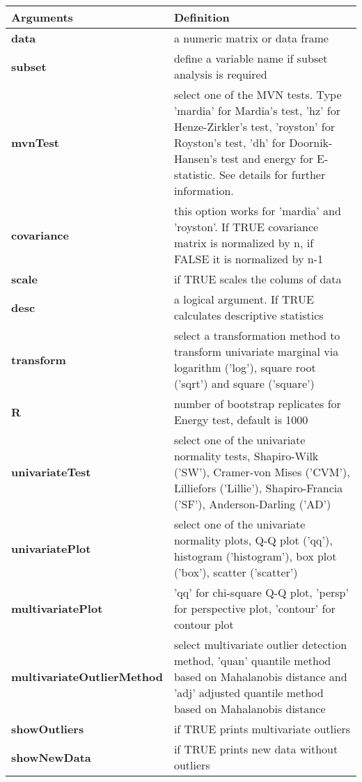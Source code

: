 \documentclass[11pt]{article}
\begin{document}
\begin{Schunk}
\begin{Soutput}
\begin{table}[H]
\centering{}
\begin{table}[H]
\centering
\begin{tabular}{>{\bfseries\leavevmode\color{black}}l>{\raggedright\arraybackslash}p{30em}}
\hiderowcolors
\toprule
Arguments & Definition\\
\midrule
\showrowcolors
data & a numeric matrix or data frame\\
subset & define a variable name if subset analysis is required\\
mvnTest & select one of the MVN tests. Type 'mardia' for Mardia's test, 'hz' for Henze-Zirkler's test, 'royston' for Royston's test, 'dh' for Doornik-Hansen's test and energy for E-statistic. See details for further information.\\
covariance & this option works for 'mardia' and 'royston'. If TRUE covariance matrix is normalized by n, if FALSE it is normalized by n-1\\
scale & if TRUE scales the colums of data\\
\addlinespace
desc & a logical argument. If TRUE calculates descriptive statistics\\
transform & select a transformation method to transform univariate marginal via logarithm ('log'), square root ('sqrt') and square ('square')\\
R & number of bootstrap replicates for Energy test, default is 1000\\
univariateTest & select one of the univariate normality tests, Shapiro-Wilk ('SW'), Cramer-von Mises ('CVM'), Lilliefors ('Lillie'), Shapiro-Francia ('SF'), Anderson-Darling ('AD')\\
univariatePlot & select one of the univariate normality plots, Q-Q plot ('qq'), histogram ('histogram'), box plot ('box'), scatter ('scatter')\\
\addlinespace
multivariatePlot & 'qq' for chi-square Q-Q plot, 'persp' for perspective plot, 'contour' for contour plot\\
multivariateOutlierMethod & select multivariate outlier detection method, 'quan' quantile method based on Mahalanobis distance and 'adj' adjusted quantile method based on Mahalanobis distance\\
showOutliers & if TRUE prints multivariate outliers\\
showNewData & if TRUE prints new data without outliers\\
\bottomrule
\end{tabular}
\end{table}
\end{table}
\end{Soutput}
\end{Schunk}
\end{document}
